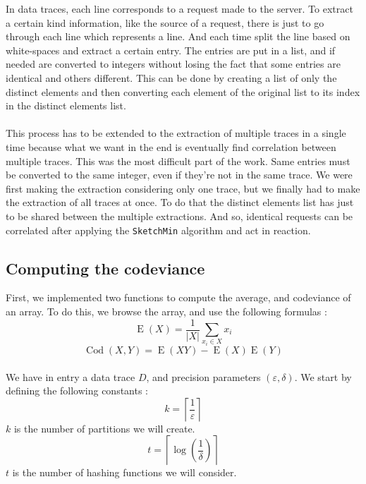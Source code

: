 \documentclass[a4paper]{article}%
\DeclareMathOperator{\E}{E}
\DeclareMathOperator{\Cod}{Cod}
\begin{document}
In data traces, each line corresponds to a request made to the server. To extract a certain kind information, like the source of a request, there is just to go through each line which represents a line. And each time split the line based on white-spaces and extract a certain entry. The entries are put in a list, and if needed are converted to integers without losing the fact that some entries are identical and others different. This can be done by creating a list of only the distinct elements and then converting each element of the original list to its index in the distinct elements list.

\paragraph{}This process has to be extended to the extraction of multiple traces in a single time because what we want in the end is eventually find correlation between multiple traces. This was the most difficult part of the work. Same entries must be converted to the same integer, even if they're not in the same trace. We were first making the extraction considering only one trace, but we finally had to make the extraction of all traces at once. To do that the distinct elements list has just to be shared between the multiple extractions. And so, identical requests can be correlated after applying the \texttt{SketchMin} algorithm and act in reaction.

\subsection{Computing the codeviance}

First, we implemented two functions to compute the average, and codeviance of an array. To do this, we browse the array, and use the following formulas :
	\[ \E(X) = \frac{1}{|X|} \sum\limits_{x_i \in X} x_i \]
	\[ \Cod(X,Y) = \E(XY) - \E(X)\E(Y) \]
	
\paragraph{}We have in entry a data trace $D$, and precision parameters $(\varepsilon, \delta)$. We start by defining the following constants :
	\[ k =\left\lceil \frac{1}{\varepsilon} \right\rceil \]
$k$ is the number of partitions we will create.
	\[ t = \left\lceil \log(\frac{1}{\delta}) \right\rceil \]
$t$ is the number of hashing functions we will consider.
	
\end{document}
